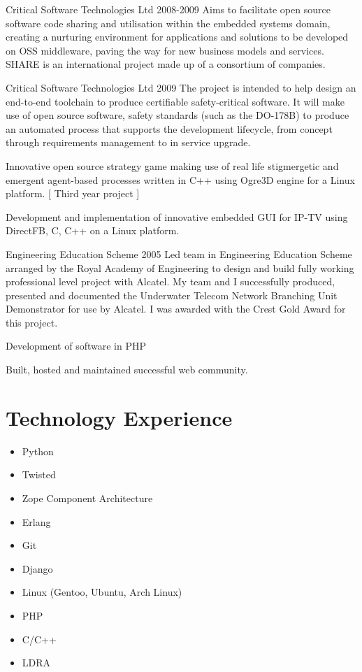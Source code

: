 \documentclass[overlapped,line,letterpaper]{res}
\begin{document}
\begin{resume}
  {Critical Software Technologies Ltd}
  {2008-2009}
{
    Aims to facilitate open source software code sharing and utilisation within
    the embedded systems domain, creating a nurturing environment for
    applications and solutions to be developed on OSS middleware, paving the way
    for new business models and services.
    SHARE is an international project made up of a consortium of companies.
}

  {Critical Software Technologies Ltd}
  {2009}
{
    The project is intended to help design an end-to-end toolchain to produce
    certifiable safety-critical software.
    It will make use of open source software, safety standards (such as the
    DO-178B) to produce an automated process that supports the development
    lifecycle, from concept through requirements management to in service
    upgrade.
}

{
    Innovative open source strategy game making use of real life stigmergetic
    and emergent agent-based processes written in C++ using Ogre3D engine for a
    Linux platform. [ Third year project ]
}

{
    Development and implementation of innovative embedded GUI for IP-TV using
    DirectFB, C, C++ on a Linux platform.
}

  {Engineering Education Scheme}
  {2005}
{
    Led team in Engineering Education Scheme arranged by the Royal Academy of
    Engineering to design and build fully working professional level project
    with Alcatel.
    My team and I successfully produced, presented and documented the Underwater
    Telecom Network Branching Unit Demonstrator for use by Alcatel.
    I was awarded with the Crest Gold Award for this project.
}

{
    Development of software in PHP
}

{
    Built, hosted and maintained successful web community.
}

\section{\bf{Technology Experience} }
\begin{itemize}
 \item Python
 \item Twisted
 \item Zope Component Architecture
 \item Erlang
 \item Git
 \item Django
 \item Linux (Gentoo, Ubuntu, Arch Linux)
 \item PHP
 \item C/C++
 \item LDRA
\end{itemize}


\end{resume}
\end{document}

